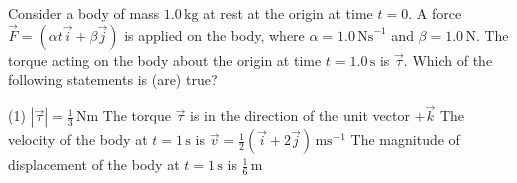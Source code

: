 
\item Consider a body of mass \(1.0 \, \text{kg}\) at rest at the origin at time \( t = 0 \). A force \( \vec{F} = (\alpha t \vec{i} + \beta \vec{j}) \) is applied on the body, where \( \alpha = 1.0 \, \text{Ns}^{-1} \) and \( \beta = 1.0 \, \text{N} \). The torque acting on the body about the origin at time \( t = 1.0 \, \text{s} \) is \( \vec{\tau} \). Which of the following statements is (are) true?
	\begin{tasks}(1)
			\task \( |\vec{\tau}| = \frac{1}{3} \, \text{Nm} \)
			\task The torque \( \vec{\tau} \) is in the direction of the unit vector \( + \vec{k} \)
			\task The velocity of the body at \( t = 1 \, \text{s} \) is \( \vec{v} = \frac{1}{2} (\vec{i} + 2\vec{j}) \, \text{ms}^{-1} \)
			\task The magnitude of displacement of the body at \( t = 1 \, \text{s} \) is \( \frac{1}{6} \, \text{m} \)
	\end{tasks}
